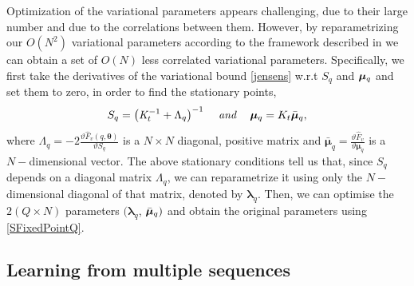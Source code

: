 \documentclass{article} %
\begin{document}
Optimization of the variational parameters appears challenging, due to
their large number and due to the correlations between them. However, by
reparametrizing our $O \left( N^2 \right)$ variational parameters
according to the framework described in
\cite{OpperFixedPointCovariance} we can obtain a set of $O(N)$ 
less correlated variational parameters. Specifically, we first take the derivatives of the variational bound \eqref{jensens} w.r.t $S_q$ and $\boldsymbol \mu_q$ and set them to zero, in order to find the stationary points,
\begin{equation}
S_q = \left( \mathit{K}_t^{-1} + \Lambda_q \right)^{-1} \;\;\; \mbox{ \textit{and} } \;\;\;  \boldsymbol \mu_q = K_t \bar{\boldsymbol \mu}_q, \label{SFixedPointQ}
\end{equation}
where $\Lambda_q = - 2\frac{\vartheta \mathit{\hat{F}_v(q, \boldsymbol
    \theta)}}{\vartheta \mathit{S_q}}$ is a $N \times N$ diagonal,
positive matrix and $\bar{\boldsymbol \mu}_q = \frac{\vartheta
  \hat{F}_v}{\vartheta \boldsymbol \mu_q}$ is a $N-$dimensional
vector.
The above stationary conditions tell us that, since 
$S_q$ depends on a diagonal matrix $\Lambda_q$, 
we can reparametrize it using only the $N-$dimensional diagonal of that matrix, denoted by $\boldsymbol \lambda_q$.
Then, we can optimise the $2 (Q \times N)$ parameters $( \boldsymbol \lambda_q$, $\bar{\boldsymbol \mu}_q)$ and obtain the original parameters using \eqref{SFixedPointQ}.



\subsection{Learning from multiple sequences \label{sequences}}
\end{document}
